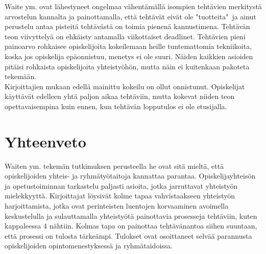 \documentclass[finnish]{../tktltiki2}
\theoremstyle{definition}
\theoremstyle{remark}
\begin{document}
\begin{itemize}
Waite ym. ovat lähestyneet ongelmaa vähentämällä isompien tehtävien merkitystä arvostelun kannalta ja painottamalla, että tehtävät eivät ole "tuotteita"~ja ainut perustelu antaa pisteitä tehtävästä on toimia pienenä kannustimena. Tehtävän teon viivyttelyä on ehkäisty antamalla viikottaiset deadlinet. Tehtävien pieni painoarvo rohkaisee opiskelijoita kokeilemaan heille tuntemattomia tekniikoita, koska jos opiskelija epäonnistuu, menetys ei ole suuri. Näiden kaikkien asioiden pitäisi rohkaista opiskelijoita yhteistyöhön, mutta näin ei kuitenkaan pakoteta tekemään.\\

Kirjoittajien mukaan edellä mainittu kokeilu on ollut onnistunut. Opiskelijat käyttävät edelleen yhtä paljon aikaa tehtäviin, mutta kokevat niiden teon opettavaisempina kuin ennen, kun tehtävän lopputulos ei ole etusijalla.

\end{itemize}

\section{Yhteenveto}

Waiten ym. tekemän tutkimuksen perusteella he ovat sitä mieltä, että opiskelijoiden yhteis- ja ryhmätyötaitoja kannattaa parantaa. Opiskelijayhteisön ja opetustoiminnan tarkastelu paljasti asioita, jotka jarruttavat yhteistyön mielekkyyttä. Kirjoittajat löysivät kolme tapaa vahvistaakseen yhteistyön harjoittamista, jotka ovat perinteisten luentojen korvaaminen avoimella keskustelulla ja sulauttamalla yhteistyötä painottavia prosesseja tehtäviin, kuten kappaleessa 4 nähtiin. Kolmas tapa on painottaa tehtävänantoa siihen suuntaan, että prosessi on tulosta tärkeämpi. Tulokset ovat osoittaneet selvää parannusta opiskelijoiden opintomenestyksessä ja ryhmätaidoissa.

%
%
% 
%



\end{document}
